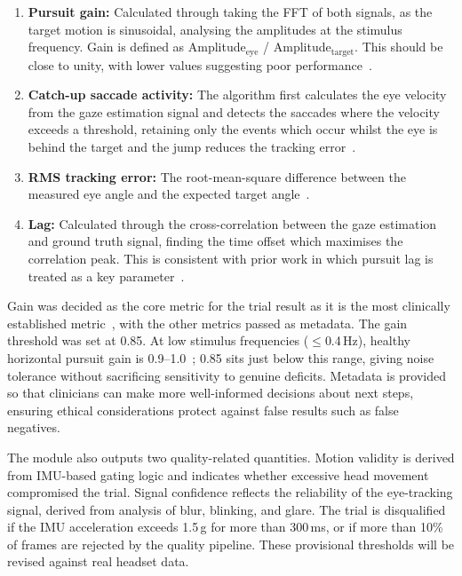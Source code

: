 \begin{enumerate}
    \item \textbf{Pursuit gain:} Calculated through taking the FFT of both signals, as the target motion is sinusoidal, analysing the amplitudes at the stimulus frequency. Gain is defined as Amplitude$_{\text{eye}}$ / Amplitude$_{\text{target}}$. This should be close to unity, with lower values suggesting poor performance~\cite{devillerssidani2023oculomotor}.

    \item \textbf{Catch-up saccade activity:} The algorithm first calculates the eye velocity from the gaze estimation signal and detects the saccades where the velocity exceeds a threshold, retaining only the events which occur whilst the eye is behind the target and the jump reduces the tracking error~\cite{devillerssidani2023oculomotor}.

    \item \textbf{RMS tracking error:} The root-mean-square difference between the measured eye angle and the expected target angle~\cite{kellar2018comparing}.

    \item \textbf{Lag:} Calculated through the cross-correlation between the gaze estimation and ground truth signal, finding the time offset which maximises the correlation peak. This is consistent with prior work in which pursuit lag is treated as a key parameter~\cite{devillerssidani2023oculomotor}.
\end{enumerate}


Gain was decided as the core metric for the trial result as it is the most clinically established metric~\cite{leigh2015neurology}, with the other metrics passed as metadata. The gain threshold was set at 0.85. At low stimulus frequencies ($\leq$0.4\,Hz), healthy horizontal pursuit gain is 0.9--1.0~\cite{meyer2020smoothpursuit}; 0.85 sits just below this range, giving noise tolerance without sacrificing sensitivity to genuine deficits. Metadata is provided so that clinicians can make more well-informed decisions about next steps, ensuring ethical considerations protect against false results such as false negatives.

The module also outputs two quality-related quantities. Motion validity is derived from IMU-based gating logic and indicates whether excessive head movement compromised the trial. Signal confidence reflects the reliability of the eye-tracking signal, derived from analysis of blur, blinking, and glare. The trial is disqualified if the IMU acceleration exceeds 1.5\,g for more than 300\,ms, or if more than 10\% of frames are rejected by the quality pipeline. These provisional thresholds will be revised against real headset data.


